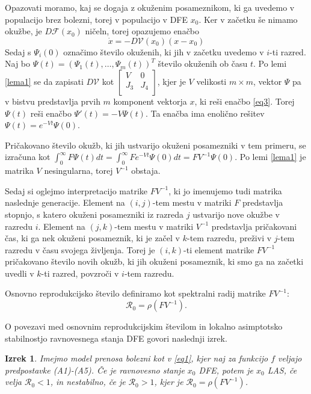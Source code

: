 \documentclass[a4paper,12pt]{article}
\newcommand{\R}{\mathcal R}
\newcommand{\F}{\mathcal F}
\newcommand{\V}{\mathcal V}
\newtheorem{izrek}{Izrek}
\begin{document}
Opazovati moramo, kaj se dogaja z okuženim posameznikom, ki ga uvedemo v populacijo brez 
bolezni, torej v populacijo v DFE \(x_0\). Ker v začetku še nimamo okužbe, je 
\(D\F(x_0)\) ničeln, torej opazujemo enačbo
\begin{equation}\label{eq3}
    \dot{x}=-D\V(x_0)(x-x_0)
\end{equation}
Sedaj s \(\Psi_i(0)\) označimo število okuženih, ki jih v začetku uvedemo v \(i\)-ti 
razred. Naj bo \(\Psi(t)=(\Psi_1(t),\ldots,\Psi_m(t))^T\) število okuženih ob času \(t\). 
Po lemi \ref{lema1} se da zapisati \(D\V\) kot 
\(
\begin{bmatrix}
    V & 0 \\
    J_3 & J_4 \\
\end{bmatrix}
\),
kjer je \(V\) velikosti \(m \times m\), vektor \(\Psi\) pa v bistvu
predstavlja prvih \(m\) komponent vektorja \(x\), ki reši enačbo \ref{eq3}. Torej 
\(\Psi(t)\) reši enačbo \(\Psi'(t)=-V\Psi(t)\). Ta enačba ima enolično rešitev 
\(\Psi(t)=e^{-Vt}\Psi(0)\).

Pričakovano število okužb, ki jih ustvarijo okuženi posamezniki v tem primeru,
se izračuna kot \(\int_0^\infty F\Psi(t)dt = \int_0^\infty Fe^{-Vt}\Psi(0)dt = FV^{-1}\Psi(0)\).
Po lemi \ref{lema1} je matrika \(V\) nesingularna, torej \(V^{-1}\) obstaja. 

Sedaj si oglejmo interpretacijo matrike \(FV^{-1}\), ki jo imenujemo tudi matrika naslednje generacije. 
Element na \((i,j)\)-tem mestu
v matriki \(F\) predstavlja stopnjo, s katero okuženi posamezniki iz razreda \(j\)
ustvarijo nove okužbe v razredu \(i\). Element na \((j,k)\)-tem mestu v matriki \(V^{-1}\)
predstavlja pričakovani čas, ki ga nek okuženi posameznik, ki je začel v \(k\)-tem razredu, 
preživi v \(j\)-tem razredu v času svojega življenja. Torej je \((i,k)\)-ti element 
matrike \(FV^{-1}\) pričakovano število novih okužb, ki jih okuženi posameznik, ki 
smo ga na začetki uvedli v \(k\)-ti razred, povzroči v \(i\)-tem razredu.

Osnovno reprodukcijsko število definiramo kot spektralni radij matrike \(FV^{-1}\):
\[\R_0=\rho(FV^{-1}).\]

O povezavi med osnovnim reprodukcijskim številom in lokalno asimptotsko stabilnostjo 
ravnovesnega stanja DFE govori naslednji izrek.

\begin{izrek}\label{izrek1}
    Imejmo model prenosa bolezni kot v \ref{eq1}, kjer naj za funkcijo \(f\) veljajo
    predpostavke (A1)-(A5). Če je ravnovesno stanje \(x_0\) DFE, potem je \(x_0\) LAS, 
    če velja \(\R_0<1\), in nestabilno, če je \(\R_0>1\), kjer je \(\R_0=\rho(FV^{-1})\).
\end{izrek}
\end{document}
